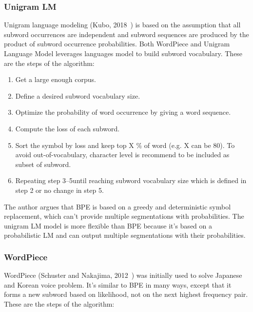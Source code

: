 \subsubsection{Unigram LM}\label{subsubsec:unigramlm}

Unigram language modeling (Kubo, 2018~\cite{kudo-2018-subword}) is based on the assumption that all subword occurrences are independent and subword sequences are produced by the product of subword occurrence probabilities. Both WordPiece and Unigram Language Model leverages languages model to build subword vocabulary. These are the steps of the algorithm:

\begin{enumerate}
    \item Get a large enough corpus.
    \item Define a desired subword vocabulary size.
    \item Optimize the probability of word occurrence by giving a word sequence.
    \item Compute the loss of each subword.
    \item Sort the symbol by loss and keep top X \% of word (e.g. X can be 80). To avoid out-of-vocabulary, character level is recommend to be included as subset of subword.
    \item Repeating step 3–5until reaching subword vocabulary size which is defined in step 2 or no change in step 5.
\end{enumerate}

The author argues that BPE is based on a greedy and deterministic symbol replacement, which can't provide multiple segmentations with probabilities. The unigram LM model is more flexible than BPE because it's based on a probabilistic LM and can output multiple segmentations with their probabilities.

\subsubsection{WordPiece}\label{subsubsec:wordpiece}

WordPiece (Schuster and Nakajima, 2012~\cite{schuster2012japanese}) was initially used to solve Japanese and Korean voice problem. It's similar to BPE in many ways, except that it forms a new subword based on likelihood, not on the next highest frequency pair. These are the steps of the algorithm:

